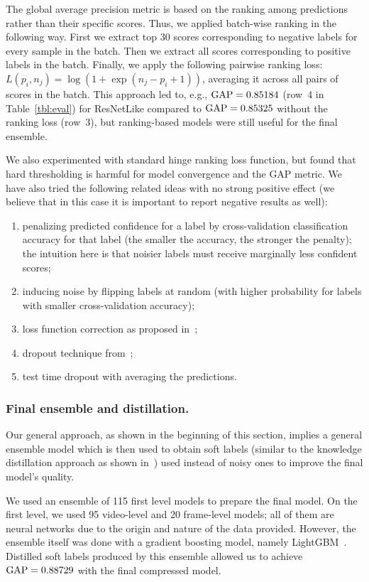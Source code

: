 \documentclass[runningheads]{llncs}
\begin{document}
The global average precision metric is based on the ranking among predictions rather than their specific scores. Thus, we applied batch-wise ranking in the following way. First we extract top 30 scores corresponding to negative labels for every sample in the batch. Then we extract all scores corresponding to positive labels in the batch. Finally, we apply the following pairwise ranking loss:
$L(p_i,n_j) = \log(1 + \exp(n_j-p_i+1))$,
averaging it across all pairs of scores in the batch. This approach led to, e.g., $\mathrm{GAP}=0.85184$ (row~4 in Table~\ref{tbl:eval}) for ResNetLike compared to $\mathrm{GAP}=0.85325$ without the ranking loss (row~3), but ranking-based models were still useful for the final ensemble.

We also experimented with standard hinge ranking loss function, but found that hard thresholding is harmful for model convergence and the GAP metric. We have also tried the following related ideas with no strong positive effect (we believe that in this case it is important to report negative results as well):
\begin{enumerate}[(1)]
\item penalizing predicted confidence for a label by cross-validation classification accuracy for that label (the smaller the accuracy, the stronger the penalty); the intuition here is that noisier labels must receive marginally less confident scores;
\item inducing noise by flipping labels at random (with higher probability for labels with smaller cross-validation accuracy);
\item loss function correction as proposed in~\cite{NIPS2013_5073};
\item dropout technique from~\cite{DBLP:journals/corr/JindalNC17};
\item test time dropout with averaging the predictions.
\end{enumerate}\subsubsection*{Final ensemble and distillation.}
Our general approach, as shown in the beginning of this section, implies a general ensemble model which is then used to obtain soft labels (similar to the knowledge distillation approach as shown in~\cite{hinton2015distilling}) used instead of noisy ones to improve the final model's quality.

We used an ensemble of 115 first level models to prepare the final model. On the first level, we used 95 video-level and 20 frame-level models; all of them are neural networks due to the origin and nature of the data provided. However, the ensemble itself was done with a gradient boosting model, namely LightGBM~\cite{NIPS2017_6907}. Distilled soft labels produced by this ensemble allowed us to achieve $\mathrm{GAP} = 0.88729$ with the final compressed model.
\end{document}
